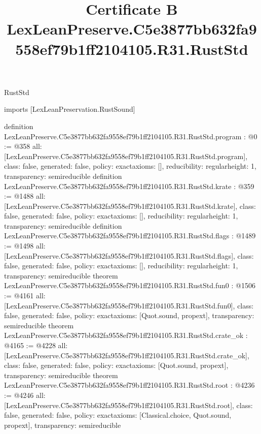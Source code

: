 \begin{lexlean}{RustStd}
\title{Certificate B LexLeanPreserve.C5e3877bb632fa9558ef79b1ff2104105.R31.RustStd}
\begin{coremodule}
imports [LexLeanPreservation.RustSound]

definition LexLeanPreserve.C5e3877bb632fa9558ef79b1ff2104105.R31.RustStd.program : @0 := @358 {
  all: [LexLeanPreserve.C5e3877bb632fa9558ef79b1ff2104105.R31.RustStd.program],
  class: false,
  generated: false,
  policy: exact{axioms: []},
  reducibility: regular{height: 1},
  transparency: semireducible
}
definition LexLeanPreserve.C5e3877bb632fa9558ef79b1ff2104105.R31.RustStd.krate : @359 := @1488 {
  all: [LexLeanPreserve.C5e3877bb632fa9558ef79b1ff2104105.R31.RustStd.krate],
  class: false,
  generated: false,
  policy: exact{axioms: []},
  reducibility: regular{height: 1},
  transparency: semireducible
}
definition LexLeanPreserve.C5e3877bb632fa9558ef79b1ff2104105.R31.RustStd.flags : @1489 := @1498 {
  all: [LexLeanPreserve.C5e3877bb632fa9558ef79b1ff2104105.R31.RustStd.flags],
  class: false,
  generated: false,
  policy: exact{axioms: []},
  reducibility: regular{height: 1},
  transparency: semireducible
}
theorem LexLeanPreserve.C5e3877bb632fa9558ef79b1ff2104105.R31.RustStd.fun0 : @1506 := @4161 {
  all: [LexLeanPreserve.C5e3877bb632fa9558ef79b1ff2104105.R31.RustStd.fun0],
  class: false,
  generated: false,
  policy: exact{axioms: [Quot.sound, propext]},
  transparency: semireducible
}
theorem LexLeanPreserve.C5e3877bb632fa9558ef79b1ff2104105.R31.RustStd.crate_ok : @4165 := @4228 {
  all: [LexLeanPreserve.C5e3877bb632fa9558ef79b1ff2104105.R31.RustStd.crate_ok],
  class: false,
  generated: false,
  policy: exact{axioms: [Quot.sound, propext]},
  transparency: semireducible
}
theorem LexLeanPreserve.C5e3877bb632fa9558ef79b1ff2104105.R31.RustStd.root : @4236 := @4246 {
  all: [LexLeanPreserve.C5e3877bb632fa9558ef79b1ff2104105.R31.RustStd.root],
  class: false,
  generated: false,
  policy: exact{axioms: [Classical.choice, Quot.sound, propext]},
  transparency: semireducible
}


\end{coremodule}
\end{lexlean}
